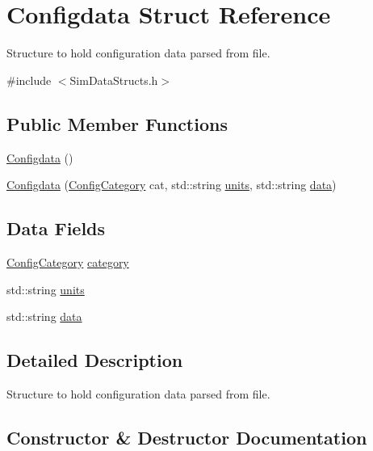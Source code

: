 \hypertarget{struct_configdata}{}\section{Configdata Struct Reference}
\label{struct_configdata}


Structure to hold configuration data parsed from file.  




{\ttfamily \#include $<$Sim\+Data\+Structs.\+h$>$}

\subsection*{Public Member Functions}
\begin{DoxyCompactItemize}
\item 
\hyperlink{struct_configdata_a44f5fb79e4925f7c65bc0f701f0b3419}{Configdata} ()
\item 
\hyperlink{struct_configdata_a573adee7ab056c69b257686c945f6eba}{Configdata} (\hyperlink{_sim_data_structs_8h_a32f23b552ade08d96d49cc3061a27165}{Config\+Category} cat, std\+::string \hyperlink{struct_configdata_a5fd9c1be63267f3330fcc056d5b8edaa}{units}, std\+::string \hyperlink{struct_configdata_a073f302b2e65d70ca077fc3bb5e7a090}{data})
\end{DoxyCompactItemize}
\subsection*{Data Fields}
\begin{DoxyCompactItemize}
\item 
\hyperlink{_sim_data_structs_8h_a32f23b552ade08d96d49cc3061a27165}{Config\+Category} \hyperlink{struct_configdata_a1daa0b904ee36697035bb1b251735b86}{category}
\item 
std\+::string \hyperlink{struct_configdata_a5fd9c1be63267f3330fcc056d5b8edaa}{units}
\item 
std\+::string \hyperlink{struct_configdata_a073f302b2e65d70ca077fc3bb5e7a090}{data}
\end{DoxyCompactItemize}


\subsection{Detailed Description}
Structure to hold configuration data parsed from file. 

\subsection{Constructor \& Destructor Documentation}
\hypertarget{struct_configdata_a44f5fb79e4925f7c65bc0f701f0b3419}{}\label{struct_configdata_a44f5fb79e4925f7c65bc0f701f0b3419} 
